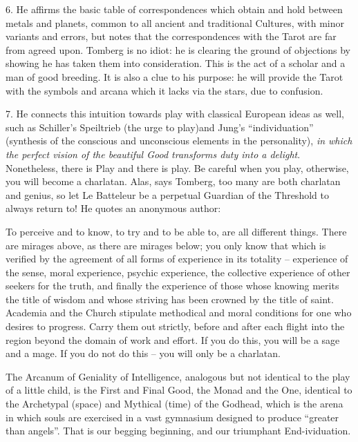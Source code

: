 6. He affirms the basic table of correspondences which obtain and hold between metals and planets, common to all ancient and traditional Cultures, with minor variants and errors, but notes that the correspondences with the Tarot are far from agreed upon. Tomberg is no idiot: he is clearing the ground of objections by showing he has taken them into consideration. This is the act of a scholar and a man of good breeding. It is also a clue to his purpose: he will provide the Tarot with the symbols and arcana which it lacks via the stars, due to confusion.

7. He connects this intuition towards play with classical European ideas as well, such as Schiller's Speiltrieb (the urge to play)and Jung's ``individuation'' (synthesis of the conscious and unconscious elements in the personality), \emph{in which the perfect vision of the beautiful Good transforms duty into a delight}. Nonetheless, there is Play and there is play. Be careful when you play, otherwise, you will become a charlatan. Alas, says Tomberg, too many are both charlatan and genius, so let Le Batteleur be a perpetual Guardian of the Threshold to always return to! He quotes an anonymous author:

\begin{quotex}
To perceive and to know, to try and to be able to, are all different things. There are mirages above, as there are mirages below; you only know that which is verified by the agreement of all forms of experience in its totality -- experience of the sense, moral experience, psychic experience, the collective experience of other seekers for the truth, and finally the experience of those whose knowing merits the title of wisdom and whose striving has been crowned by the title of saint. Academia and the Church stipulate methodical and moral conditions for one who desires to progress. Carry them out strictly, before and after each flight into the region beyond the domain of work and effort. If you do this, you will be a sage and a mage. If you do not do this -- you will only be a charlatan.
\end{quotex}


The Arcanum of Geniality of Intelligence, analogous but not identical to the play of a little child, is the First and Final Good, the Monad and the One, identical to the Archetypal (space) and Mythical (time) of the Godhead, which is the arena in which souls are exercised in a vast gymnasium designed to produce ``greater than angels''. That is our begging beginning, and our triumphant End-ividuation.



